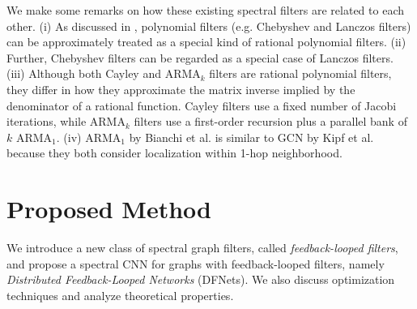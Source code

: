 \documentclass{article}
\begin{document}
\smallskip


We make some remarks on how these existing spectral filters are related to each other. (i) As discussed in \cite{bianchi2019graph,levie2017cayleynets, liao2019lanczosnet}, polynomial filters (e.g. Chebyshev and Lanczos filters) can be approximately treated as a special kind of rational polynomial filters. (ii) Further, Chebyshev filters can be regarded as a special case of Lanczos filters. (iii) Although both Cayley and ARMA$_k$ filters are rational polynomial filters, they differ in how they approximate the matrix inverse implied by the denominator of a rational function. Cayley filters use a fixed number of Jacobi iterations, while ARMA$_k$ filters use a first-order recursion plus a parallel bank of $k$ ARMA$_1$.
 (iv) ARMA$_1$ by Bianchi et al. \cite{bianchi2019graph} is similar to GCN by Kipf et al. \cite{kipf2016semi} because they both consider localization within 1-hop neighborhood. 



 
\section{Proposed Method}
\label{sec:others}\vspace{-0.2cm}
We introduce a new class of spectral graph filters, called \emph{feedback-looped filters}, and propose a spectral CNN for graphs with feedback-looped filters, namely \emph{Distributed Feedback-Looped Networks} (DFNets). We also discuss optimization techniques and analyze theoretical properties. 
\end{document}
